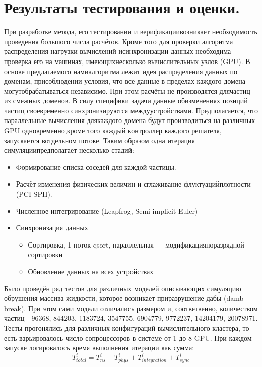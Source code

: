 \section{Результаты тестирования и оценки.}\label{sec:ch3/sect4}
При   разработке   метода,   его   тестировании   и   верификациивозникает необходимость проведения большого числа расчётов. Кроме того для проверки алгоритма распределения нагрузки вычислений исинхронизации данных необходима проверка его на машинах, имеющихнесколько вычислительных узлов (GPU). В основе предлагаемого намиалгоритма   лежит   идея   распределения   данных   по   доменам,   присоблюдении условия, что все данные в пределах каждого домена могутобрабатываться независимо. При этом расчёты не производятся длячастиц из смежных доменов. В силу специфики задачи данные обизменениях   позиций   частиц   своевременно   синхронизируются   междуустройствами.   Предполагается,   что   параллельные   вычисления   длякаждого домена будут производиться на различных GPU одновременно,кроме   того   каждый   контроллер   каждого   решателя,   запускается   вотдельном   потоке.   Таким   образом   одна   итерация   симуляциипредполагает несколько стадий:
\noindent
\begin{itemize}
  \item Формирование списка соседей для каждой частицы.
  \item Расчёт изменения физических величин и сглаживание флуктуацийплотности (PCI SPH).
  \item Численное интегрирование (Leapfrog, Semi-implicit Euler)
  \item Синхронизация данных
        \begin{itemize}
          \item Сортировка, 1 поток qsort, параллельная — модификацияпоразрядной сортировки
          \item Обновление данных на всех устройствах
        \end{itemize}
\end{itemize}
Было проведён ряд тестов для различных моделей описывающих симуляцию обрушения массива жидкости, которое возникает приразрушение дабы (damb break). При этом сами модели отличались размером и, соответвенно, количеством частиц - 96368, 844203, 1183724, 3547755, 6904779, 9772237, 14204179, 20078971. Тесты прогонялись для различных конфигураций вычислительного кластера, то есть варьировалось число сопроцессоров в системе от 1 до 8 GPU. При каждом запуске логировалось время выполнения итерации как сумма:
\[
  T_{total}^{i} = T_{ns}^{i} + T_{phys}^{i} + T_{integration}^{i} + T_{sync}^{i}
\]


